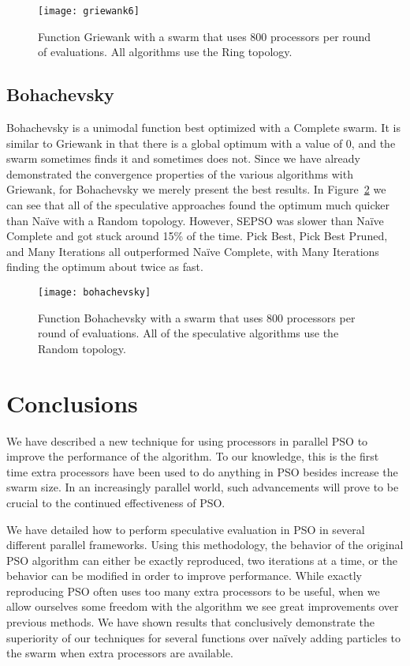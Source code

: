 \documentclass[smallcondensed]{svjour3}
\newcommand{\fig}[1]{Figure~\ref{fig:#1}}
\begin{document}
\begin{figure}
  \centering
  \texttt{[image: griewank6]}
  \caption{Function Griewank with a swarm that uses 800 processors per round of
  evaluations.  All algorithms use the Ring topology.}
  \label{fig:griewank-800}
\end{figure}

\subsection{Bohachevsky}

Bohachevsky is a unimodal function best optimized with a Complete swarm.  It is
similar to Griewank in that there is a global optimum with a value of 0, and
the swarm sometimes finds it and sometimes does not.  Since we have already
demonstrated the convergence properties of the various algorithms with
Griewank, for Bohachevsky we merely present the best results.  In
\fig{bohachevsky} we can see that all of the speculative approaches found the
optimum much quicker than Na\"ive with a Random topology.  However, SEPSO was
slower than Na\"ive Complete and got stuck around 15\% of the time.  Pick Best,
Pick Best Pruned, and Many Iterations all outperformed Na\"ive Complete, with
Many Iterations finding the optimum about twice as fast.

\begin{figure}
  \centering
  \texttt{[image: bohachevsky]}
  \caption{Function Bohachevsky with a swarm that uses 800 processors per round
  of evaluations.  All of the speculative algorithms use the Random topology.}
  \label{fig:bohachevsky}
\end{figure}

\section{Conclusions}
\label{sec:conclusion}

We have described a new technique for using processors in parallel PSO to
improve the performance of the algorithm.  To our knowledge, this is the first
time extra processors have been used to do anything in PSO besides increase the
swarm size.  In an increasingly parallel world, such advancements will prove to
be crucial to the continued effectiveness of PSO.

We have detailed how to perform speculative evaluation in PSO in several
different parallel frameworks.  Using this methodology, the behavior of the
original PSO algorithm can either be exactly reproduced, two iterations at a
time, or the behavior can be modified in order to improve performance.  While
exactly reproducing PSO often uses too many extra processors to be useful, when
we allow ourselves some freedom with the algorithm we see great improvements
over previous methods.  We have shown results that conclusively demonstrate the
superiority of our techniques for several functions over na\"ively adding
particles to the swarm when extra processors are available.
\end{document}
